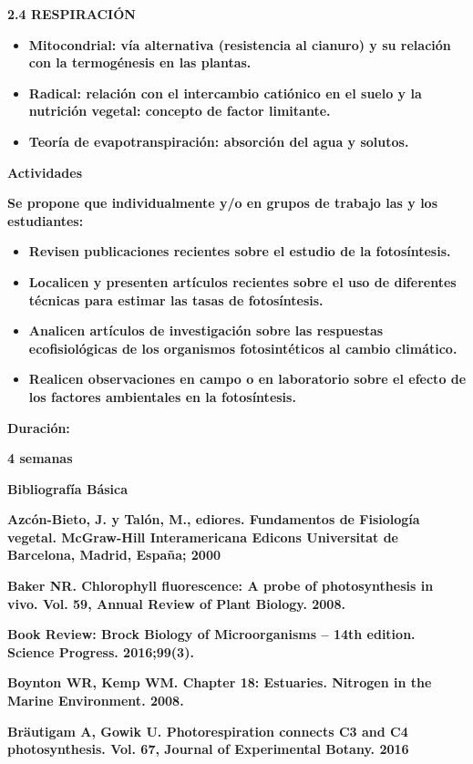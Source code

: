 \documentclass[
]{article}
\begin{document}
\textbf{2.4 RESPIRACIÓN}

\begin{itemize}
\item
  \textbf{Mitocondrial: vía alternativa (resistencia al cianuro) y su
  relación con la termogénesis en las plantas.}
\item
  \textbf{Radical: relación con el intercambio catiónico en el suelo y
  la nutrición vegetal: concepto de factor limitante.}
\item
  \textbf{Teoría de evapotranspiración: absorción del agua y solutos.}
\end{itemize}

\textbf{Actividades}

\textbf{Se propone que individualmente y/o en grupos de trabajo las y
los estudiantes:}

\begin{itemize}
\item
  \textbf{Revisen publicaciones recientes sobre el estudio de la
  fotosíntesis.}
\item
  \textbf{Localicen y presenten artículos recientes sobre el uso de
  diferentes técnicas para estimar las tasas de fotosíntesis.}
\item
  \textbf{Analicen artículos de investigación sobre las respuestas
  ecofisiológicas de los organismos fotosintéticos al cambio climático.}
\item
  \textbf{Realicen observaciones en campo o en laboratorio sobre el
  efecto de los factores ambientales en la fotosíntesis.}
\end{itemize}

\textbf{Duración:}

\textbf{4 semanas}

\textbf{Bibliografía Básica}

\textbf{Azcón-Bieto, J. y Talón, M., ediores. Fundamentos de Fisiología
vegetal. McGraw-Hill Interamericana Edicons Universitat de Barcelona,
Madrid, España; 2000}

\textbf{Baker NR. Chlorophyll fluorescence: A probe of photosynthesis in
vivo. Vol. 59, Annual Review of Plant Biology. 2008.}

\textbf{Book Review: Brock Biology of Microorganisms -- 14th edition.
Science Progress. 2016;99(3).}

\textbf{Boynton WR, Kemp WM. Chapter 18: Estuaries. Nitrogen in the
Marine Environment. 2008.}

\textbf{Bräutigam A, Gowik U. Photorespiration connects C3 and C4
photosynthesis. Vol. 67, Journal of Experimental Botany. 2016}
\end{document}
